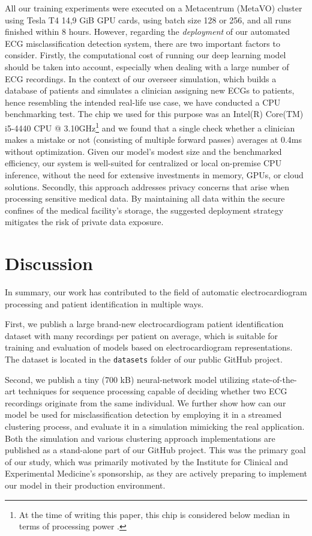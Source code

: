 \documentclass[preprint,12pt]{elsarticle}
\begin{document}
All our training experiments were executed on a Metacentrum (MetaVO) cluster using Tesla T4 14,9 GiB GPU cards, using batch size 128 or 256, and all runs finished within 8 hours. However, regarding the \textit{deployment} of our automated ECG misclassification detection system, there are two important factors to consider. Firstly, the computational cost of running our deep learning model should be taken into account, especially when dealing with a large number of ECG recordings. In the context of our overseer simulation, which builds a database of patients and simulates a clinician assigning new ECGs to patients, hence resembling the intended real-life use case, we have conducted a CPU benchmarking test. The chip we used for this purpose was an Intel(R) Core(TM) i5-4440 CPU @ 3.10GHz\footnote{At the time of writing this paper, this chip is considered below median in terms of processing power \cite{cpu-benchmark}.} and we found that a single check whether a clinician makes a mistake or not (consisting of multiple forward passes) averages at 0.4ms without optimization. Given our model's modest size and the benchmarked efficiency, our system is well-suited for centralized or local on-premise CPU inference, without the need for extensive investments in memory, GPUs, or cloud solutions. Secondly, this approach addresses privacy concerns that arise when processing sensitive medical data. By maintaining all data within the secure confines of the medical facility's storage, the suggested deployment strategy mitigates the risk of private data exposure.

\section{Discussion}

In summary, our work has contributed to the field of automatic electrocardiogram processing and patient identification in multiple ways. 

First, we publish a large brand-new electrocardiogram patient identification dataset with many recordings per patient on average, which is suitable for training and evaluation of models based on electrocardiogram representations. The dataset is located in the \verb|datasets| folder of our public GitHub project.

Second, we publish a tiny (700 kB) neural-network model utilizing state-of-the-art techniques for sequence processing capable of deciding whether two ECG recordings originate from the same individual. We further show how can our model be used for misclassification detection by employing it in a streamed clustering process, and evaluate it in a simulation mimicking the real application. Both the simulation and various clustering approach implementations are published as a stand-alone part of our GitHub project. This was the primary goal of our study, which was primarily motivated by the Institute for Clinical and Experimental Medicine's sponsorship, as they are actively preparing to implement our model in their production environment.
\end{document}
